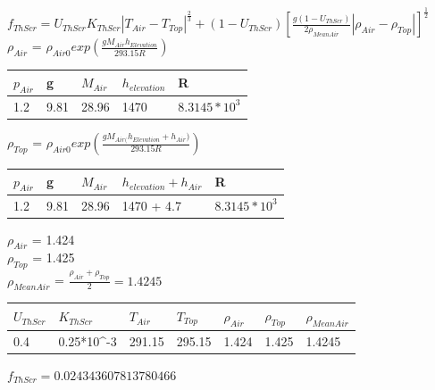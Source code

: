 \documentclass[a4paper]{article}
\numberwithin{equation}{section}
\begin{document}
\begin{itemize}
$f_{ThScr} = U_{ThScr}K_{ThScr}|T_{Air}-T_{Top}|^{\frac{2}{3}}+(1-U_{ThScr})[\frac{g(1-U_{ThScr})}{2\rho_{MeanAir}}|\rho_{Air} - \rho_{Top}|]^{\frac{1}{2}}$
\\
$\rho_{Air}$ = $\rho_{Air0}$$exp(\frac{gM_{Air}h_{Elevation}}{293.15R})$
\begin{table}[H]
\centering
\begin{tabular}{|l|l|l|l|l|}
\hline
\rowcolor[HTML]{FFFC9E} 
\cellcolor[HTML]{FFFC9E}\textbf{$p_{Air}$} & \cellcolor[HTML]{FFFC9E}\textbf{g} & \textbf{$M_{Air}$} & \textbf{$h_{elevation}$} & \textbf{R}                   \\ \hline
1.2                                   & 9.81                               & 28.96         & 1470                & $8.3145*10^3$ \\ \hline
\end{tabular}
\end{table}
$\rho_{Top}$ = $\rho_{Air0}$$exp(\frac{gM_{Air(}h_{Elevation}+h_{Air})}{293.15R})$
\begin{table}[H]
\centering
\begin{tabular}{|l|l|l|l|l|}
\hline
\rowcolor[HTML]{FFFC9E} 
\cellcolor[HTML]{FFFC9E}\textbf{$p_{Air}$} & \cellcolor[HTML]{FFFC9E}\textbf{g} & \textbf{$M_{Air}$} & \textbf{$h_{elevation}+h_{Air}$} & \textbf{R}                   \\ \hline
1.2                                   & 9.81                               & 28.96         & 1470 + 4.7               & $8.3145*10^3$ \\ \hline
\end{tabular}
\end{table}
$\rho_{Air}$ = 1.424\\
$\rho_{Top}$ = 1.425\\
$\rho_{MeanAir}$ = $\frac{\rho_{Air}+\rho_{Top}}{2} = 1.4245$\\

\begin{table}[H]
\centering
\begin{tabular}{|l|l|l|l|l|l|l|}
\hline
\rowcolor[HTML]{FFFC9E} 
\cellcolor[HTML]{FFFC9E}\textbf{$U_{ThScr}$} & \cellcolor[HTML]{FFFC9E}\textbf{$K_{ThScr}$} & \textbf{$T_{Air}$} & \textbf{$T_{Top}$} & \textbf{$\rho_{Air}$} & \textbf{$\rho_{Top}$} & \textbf{$\rho_{MeanAir}$} \\ \hline
0.4                                       & 0.25*10\textasciicircum{}-3             & 291.15             & 295.15             & 1.424             & 1.425             & 1.4245             \\ \hline
\end{tabular}
\end{table}
$f_{ThScr} = 0.024343607813780466$


\end{itemize}
\end{document}
